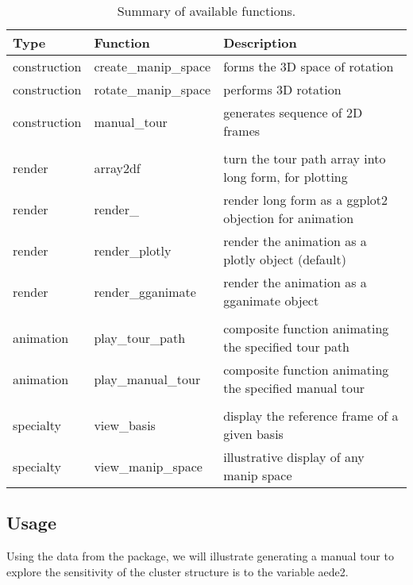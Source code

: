 \begin{Schunk}
\begin{table}

\caption{\label{tab:functionsTable}Summary of available functions.}
\centering
\begin{tabular}[t]{lll}
\toprule
Type & Function & Description\\
\midrule
construction & create\_manip\_space & forms the 3D space of rotation\\
construction & rotate\_manip\_space & performs 3D rotation\\
construction & manual\_tour & generates sequence of 2D frames\\
 &  & \\
render & array2df & turn the tour path array into long form, for plotting\\
render & render\_ & render long form as a ggplot2 objection for animation\\
render & render\_plotly & render the animation as a plotly object (default)\\
render & render\_gganimate & render the animation as a gganimate object\\
 &  & \\
animation & play\_tour\_path & composite function animating the specified tour path\\
animation & play\_manual\_tour & composite function animating the specified manual tour\\
 &  & \\
specialty & view\_basis & display the reference frame of a given basis\\
specialty & view\_manip\_space & illustrative display of any manip space\\
\bottomrule
\end{tabular}
\end{table}

\end{Schunk}

\hypertarget{usage}{%
\subsection{Usage}\label{usage}}

Using the  data from the  package, we will
illustrate generating a manual tour to explore the sensitivity of the
cluster structure is to the variable aede2.

